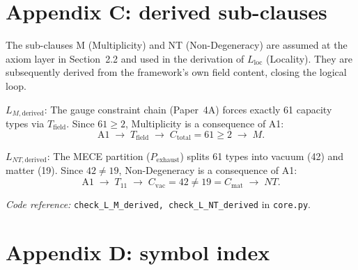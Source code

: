 \documentclass[11pt]{article}
\newcommand{\coderef}[2]{\smallskip\noindent\textit{Code reference:} \texttt{#1} in \texttt{#2}.}
\begin{document}
\section{Appendix C: derived sub-clauses}
\label{app:derived}

The sub-clauses M (Multiplicity) and NT (Non-Degeneracy) are assumed at the axiom layer in Section~2.2 and used in the derivation of $L_{\mathrm{loc}}$ (Locality).  They are subsequently derived from the framework's own field content, closing the logical loop.

\begin{tcolorbox}[apfbox, title={$L_{M,\mathrm{derived}}$ (Multiplicity Derived) and $L_{NT,\mathrm{derived}}$ (Non-Degeneracy Derived)}]
\textbf{\textit{$L_{M,\mathrm{derived}}$}}: The gauge constraint chain (Paper~4A) forces exactly 61 capacity types via $T_{\mathrm{field}}$.  Since $61 \ge 2$, Multiplicity is a consequence of A1:
\[
\text{A1} \;\to\; T_{\mathrm{field}} \;\to\; C_{\mathrm{total}} = 61 \ge 2 \;\to\; M.
\]

\textbf{\textit{$L_{NT,\mathrm{derived}}$}}: The MECE partition ($P_{\mathrm{exhaust}}$) splits 61 types into vacuum (42) and matter (19).  Since $42 \ne 19$, Non-Degeneracy is a consequence of A1:
\[
\text{A1} \;\to\; T_{11} \;\to\; C_{\mathrm{vac}} = 42 \ne 19 = C_{\mathrm{mat}} \;\to\; NT.
\]

\coderef{check\_L\_M\_derived, check\_L\_NT\_derived}{core.py}
\end{tcolorbox}


\section{Appendix D: symbol index}
\end{document}
